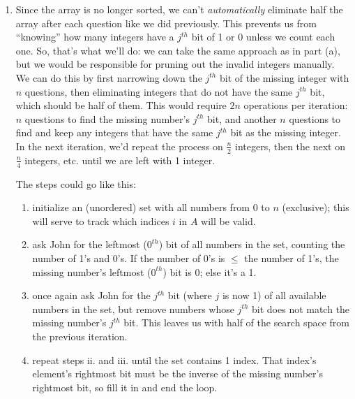 \documentclass[12pt]{article}
\begin{document}
\begin{enumerate}
\begin{enumerate}
\begin{enumerate}
        \end{enumerate}

        \item Since the array is no longer sorted, we can't \textit{automatically} eliminate half the array after each question like we did previously. 
        This prevents us from ``knowing'' how many integers have a $j^{th}$ bit of 1 or 0 unless we count each one. So, that's what 
        we'll do: we can take the same approach as in part (a), but we would be responsible for pruning out the invalid integers 
        manually. We can do this by first narrowing down the $j^{th}$ bit of the missing integer with $n$ questions, then eliminating 
        integers that do not have the same $j^{th}$ bit, which should be half of them. This would require $2n$ operations 
        per iteration: $n$ questions to find the missing number's $j^{th}$ bit, and another $n$ questions to find and keep
        any integers that have the same $j^{th}$ bit as the missing integer. In the next iteration, we'd repeat the process on $\frac{n}{2}$ 
        integers, then the next on $\frac{n}{4}$ integers, etc. until we are left with 1 integer.

        The steps could go like this:

        \begin{enumerate}
            \item initialize an (unordered) set with all numbers from 0 to $n$ (exclusive); this will serve to track which indices $i$ in 
            $A$ will be valid.

            \item ask John for the leftmost ($0^{th}$) bit of all numbers in the set, counting the number of 1's and 0's. If the number of 0's 
            is $\leq$ the number of 1's, the missing number's leftmost ($0^{th}$) bit is 0; else it's a 1.

            \item once again ask John for the $j^{th}$ bit (where $j$ is now 1) of all available numbers in the set, but remove numbers whose 
            $j^{th}$ bit does not match the missing number's $j^{th}$ bit. This leaves us with half of the search space from the 
            previous iteration.

            \item repeat steps ii. and iii. until the set contains 1 index. That index's element's rightmost bit must be the inverse of the 
            missing number's rightmost bit, so fill it in and end the loop.
        \end{enumerate}


\end{enumerate}
\end{enumerate}
\end{document}
